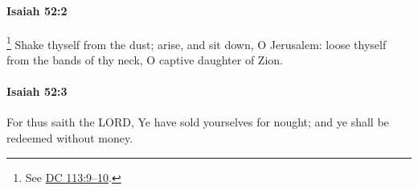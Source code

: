 		\paragraph{Isaiah 52:2} %
			\label{ISAIAH-52-2}

				\footnote{%
					See \hyperref[DC113-9]{DC 113:9--10}.
					}%
			Shake thyself from the dust; arise, and sit down, O Jerusalem: loose thyself from the bands of thy neck, O captive daughter of Zion.


		\paragraph{Isaiah 52:3} %
			\label{ISAIAH-52-3}

			For thus saith the LORD, Ye have sold yourselves for nought; and ye shall be redeemed without money.


